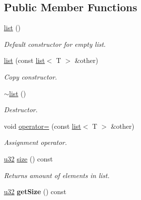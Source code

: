 \subsection*{Public Member Functions}
\begin{DoxyCompactItemize}
\item 
\hyperlink{classirr_1_1core_1_1list_aa4de347b726e57c72270377e1a07d41a}{list} ()\hypertarget{classirr_1_1core_1_1list_aa4de347b726e57c72270377e1a07d41a}{}\label{classirr_1_1core_1_1list_aa4de347b726e57c72270377e1a07d41a}

\begin{DoxyCompactList}\small\item\em Default constructor for empty list. \end{DoxyCompactList}\item 
\hyperlink{classirr_1_1core_1_1list_a28c5e720eb16cee8bf8c26c233de3722}{list} (const \hyperlink{classirr_1_1core_1_1list}{list}$<$ T $>$ \&other)\hypertarget{classirr_1_1core_1_1list_a28c5e720eb16cee8bf8c26c233de3722}{}\label{classirr_1_1core_1_1list_a28c5e720eb16cee8bf8c26c233de3722}

\begin{DoxyCompactList}\small\item\em Copy constructor. \end{DoxyCompactList}\item 
\hyperlink{classirr_1_1core_1_1list_a5c760fcc63fb6446a33d91e950736a57}{$\sim$list} ()\hypertarget{classirr_1_1core_1_1list_a5c760fcc63fb6446a33d91e950736a57}{}\label{classirr_1_1core_1_1list_a5c760fcc63fb6446a33d91e950736a57}

\begin{DoxyCompactList}\small\item\em Destructor. \end{DoxyCompactList}\item 
void \hyperlink{classirr_1_1core_1_1list_a43d98ff46af6eb5f4b1f9f71e2f0601c}{operator=} (const \hyperlink{classirr_1_1core_1_1list}{list}$<$ T $>$ \&other)\hypertarget{classirr_1_1core_1_1list_a43d98ff46af6eb5f4b1f9f71e2f0601c}{}\label{classirr_1_1core_1_1list_a43d98ff46af6eb5f4b1f9f71e2f0601c}

\begin{DoxyCompactList}\small\item\em Assignment operator. \end{DoxyCompactList}\item 
\hyperlink{namespaceirr_a0416a53257075833e7002efd0a18e804}{u32} \hyperlink{classirr_1_1core_1_1list_a64aee4e4c37522119f460c109b955767}{size} () const 
\begin{DoxyCompactList}\small\item\em Returns amount of elements in list. \end{DoxyCompactList}\item 
\hyperlink{namespaceirr_a0416a53257075833e7002efd0a18e804}{u32} {\bfseries get\+Size} () const \hypertarget{classirr_1_1core_1_1list_abbbf6ae6253ced60b259a35c34302af3}{}\label{classirr_1_1core_1_1list_abbbf6ae6253ced60b259a35c34302af3}


\end{DoxyCompactItemize}

